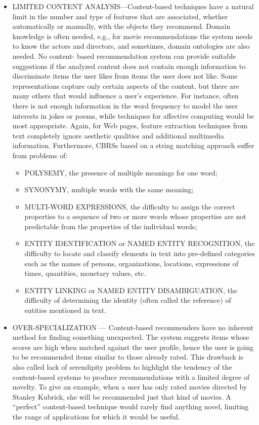 \begin{itemize}
	\item LIMITED CONTENT ANALYSIS—Content-based techniques have a natural limit in the number and type of features that are associated, whether automatically or manually, with the objects they recommend. Domain knowledge is often needed, e.g., for movie recommendations the system needs to know the actors and directors, and sometimes, domain ontologies are also needed. No content- based recommendation system can provide suitable suggestions if the analyzed content does not contain enough information to discriminate items the user likes from items the user does not like. Some representations capture only certain aspects of the content, but there are many others that would influence a user’s experience. For instance, often there is not enough information in the word frequency to model the user interests in jokes or poems, while techniques for affective computing would be most appropriate. Again, for Web pages, feature extraction techniques from text completely ignore aesthetic qualities and additional multimedia information. Furthermore, CBRSs based on a string matching approach suffer from problems of:
	\begin{itemize}
		\item POLYSEMY, the presence of multiple meanings for one word;
		\item SYNONYMY, multiple words with the same meaning;
		\item MULTI-WORD EXPRESSIONS, the difficulty to assign the correct properties to
		a sequence of two or more words whose properties are not predictable from
		the properties of the individual words;
		\item ENTITY IDENTIFICATION or NAMED ENTITY RECOGNITION, the difficulty
		to locate and classify elements in text into pre-defined categories such as the names of persons, organizations, locations, expressions of times, quantities, monetary values, etc.
		\item ENTITY LINKING or NAMED ENTITY DISAMBIGUATION, the difficulty of determining the identity (often called the reference) of entities mentioned in text.
	\end{itemize}
	\item OVER-SPECIALIZATION — Content-based recommenders have no inherent method for finding something unexpected. The system suggests items whose scores are high when matched against the user profile, hence the user is going to be recommended items similar to those already rated. This drawback is also called lack of serendipity problem to highlight the tendency of the content-based systems to produce recommendations with a limited degree of novelty. To give an example, when a user has only rated movies directed by Stanley Kubrick, she will be recommended just that kind of movies. A “perfect” content-based technique would rarely find anything novel, limiting the range of applications for which it would be useful.

\end{itemize}
